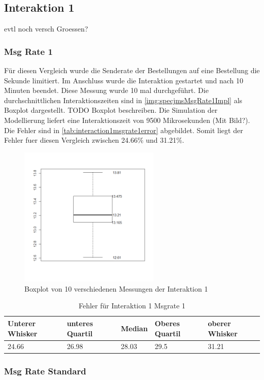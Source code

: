 \subsection{Interaktion 1}
evtl noch versch Groessen?
\subsubsection{Msg Rate 1}
Für diesen Vergleich wurde die Senderate der Bestellungen auf eine Bestellung die Sekunde limitiert. Im Anschluss wurde die Interaktion gestartet und nach 10 Minuten beendet. Diese Messung wurde 10 mal durchgeführt. Die durchschnittlichen Interaktionszeiten sind in \autoref{img:specjmsMsgRate1Impl} als Boxplot dargestellt. TODO Boxplot beschreiben. Die Simulation der Modellierung liefert eine Interaktionszeit von 9500 Mikrosekunden (Mit Bild?). Die Fehler sind in \autoref{tab:interaction1msgrate1error} abgebildet. Somit liegt der Fehler fuer diesen Vergleich zwischen 24.66\% und 31.21\%. 
\begin{figure}
\center
  \includegraphics[width=0.6\textwidth]{images/evaluation/specjms/interaction1msgrate1.png}
  \caption{Boxplot von 10 verschiedenen Messungen der Interaktion 1}
  \label{img:specjmsMsgRate1Impl}
\end{figure}
\begin{table}
  \begin{tabular}{|l|l|l|l|l|}
    Unterer Whisker & unteres Quartil & Median & Oberes Quartil & oberer Whisker \\
    \hline
    24.66 & 26.98 & 28.03 & 29.5 & 31.21
  \end{tabular}
	\caption{\label{tab:interaction1msgrate1error} Fehler für Interaktion 1 Msgrate 1}
\end{table}
\subsubsection{Msg Rate Standard}
